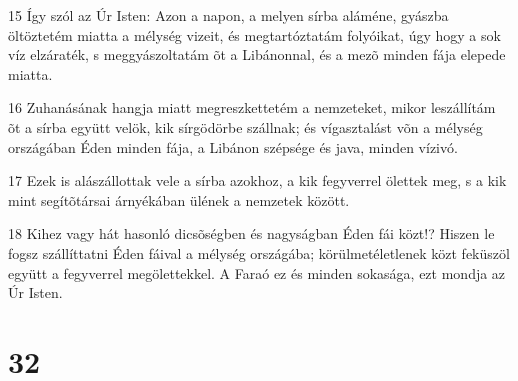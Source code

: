 \par 15 Így szól az Úr Isten: Azon a napon, a melyen sírba aláméne, gyászba öltöztetém miatta a mélység vizeit, és megtartóztatám folyóikat, úgy hogy a sok víz elzáraték, s meggyászoltatám õt a Libánonnal, és a mezõ minden fája elepede miatta.
\par 16 Zuhanásának hangja miatt megreszkettetém a nemzeteket, mikor leszállítám õt a sírba együtt velök, kik sírgödörbe szállnak; és vígasztalást võn a mélység országában Éden minden fája, a Libánon  szépsége és java, minden vízivó.
\par 17 Ezek is alászállottak vele a sírba azokhoz, a kik fegyverrel ölettek meg, s a kik mint segítõtársai árnyékában ülének a nemzetek között.
\par 18 Kihez vagy hát hasonló dicsõségben és nagyságban Éden fái közt!? Hiszen le fogsz szállíttatni Éden fáival a mélység országába; körülmetéletlenek közt feküszöl együtt a fegyverrel megölettekkel. A Faraó ez és minden sokasága, ezt mondja az Úr Isten.

\chapter{32}

